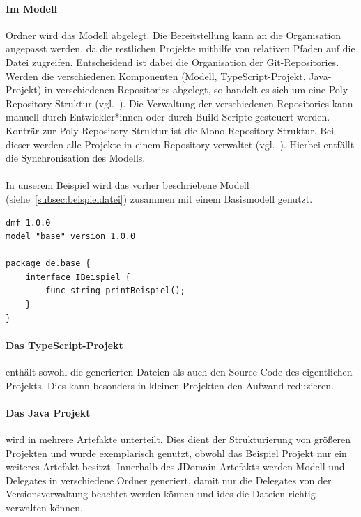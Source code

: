 \documentclass[./einleitung.tex]{subfiles}
\begin{document}
    \paragraph{Im Modell} Ordner wird das Modell abgelegt.
    Die Bereitstellung kann an die Organisation angepasst werden, da die restlichen Projekte mithilfe von relativen Pfaden auf die Datei zugreifen.
    Entscheidend ist dabei die Organisation der Git-Repositories.
    Werden die verschiedenen Komponenten (Modell, TypeScript-Projekt, Java-Projekt) in verschiedenen Repositories abgelegt, so handelt es sich um eine Poly-Repository Struktur (vgl.~\cite{monorepo}).
    Die Verwaltung der verschiedenen Repositories kann manuell durch Entwickler*innen oder durch Build Scripte gesteuert werden.
    Konträr zur Poly-Repository Struktur ist die Mono-Repository Struktur.
    Bei dieser werden alle Projekte in einem Repository verwaltet (vgl.~\cite{monorepo}).
    Hierbei entfällt die Synchronisation des Modells.
    \\\\
    In unserem Beispiel wird das vorher beschriebene Modell (siehe~\ref{subsec:beispieldatei}) zusammen mit einem Basismodell genutzt.
    \begin{lstlisting}[language=dmf, caption=Das Basismodell, label=lst:basismodell]
dmf 1.0.0
model "base" version 1.0.0

package de.base {
    interface IBeispiel {
        func string printBeispiel();
    }
}
    \end{lstlisting}

    \paragraph{Das TypeScript-Projekt} enthält sowohl die generierten Dateien als auch den Source Code des eigentlichen Projekts.
    Dies kann besonders in kleinen Projekten den Aufwand reduzieren.

    \paragraph{Das Java Projekt} wird in mehrere Artefakte unterteilt.
    Dies dient der Strukturierung von größeren Projekten und wurde exemplarisch genutzt, obwohl das Beispiel Projekt nur ein weiteres Artefakt besitzt.
    Innerhalb des JDomain Artefakts werden Modell und Delegates in verschiedene Ordner generiert, damit nur die Delegates von der Versionsverwaltung beachtet werden können und \acrshort{ide}s die Dateien richtig verwalten können.
\end{document}

